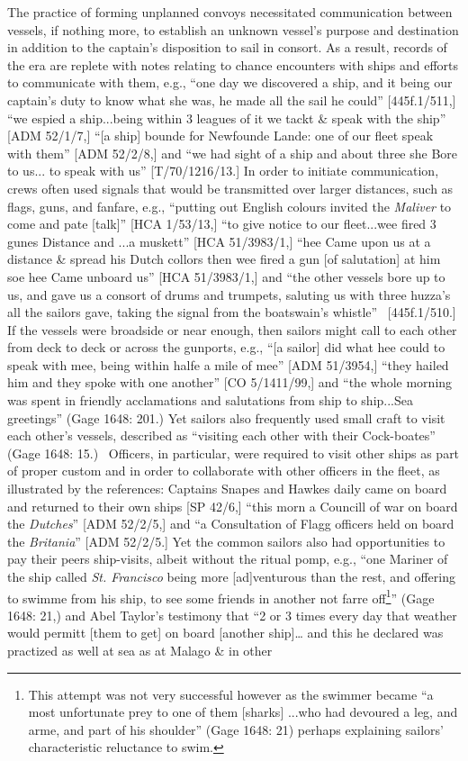 \begin{styleStandard}
The practice of forming unplanned convoys necessitated communication between vessels, if nothing more, to establish an unknown vessel’s purpose and destination in addition to the captain’s disposition to sail in consort. As a result, records of the era are replete with notes relating to chance encounters with ships and efforts to communicate with them, e.g., “one day we discovered a ship, and it being our captain’s duty to know what she was, he made all the sail he could” [445f.1/511,] “we espied a ship...being within 3 leagues of it we tackt \& speak with the ship” [ADM 52/1/7,] “[a ship] bounde for Newfounde Lande: one of our fleet speak with them” [ADM 52/2/8,] and “we had sight of a ship and about three she Bore to us... to speak with us” [T/70/1216/13.] In order to initiate communication, crews often used signals that would be transmitted over larger distances, such as flags, guns, and fanfare, e.g., “putting out English colours invited the \textit{Maliver} to come and pate [talk]” [HCA 1/53/13,] “to give notice to our fleet...wee fired 3 gunes Distance and ...a muskett” [HCA 51/3983/1,] “hee Came upon us at a distance \& spread his Dutch collors then wee fired a gun [of salutation] at him soe hee Came unboard us” [HCA 51/3983/1,] and “the other vessels bore up to us, and gave us a consort of drums and trumpets, saluting us with three huzza’s all the sailors gave, taking the signal from the boatswain’s whistle” \ [445f.1/510.] If the vessels were broadside or near enough, then sailors might call to each other from deck to deck or across the gunports, e.g., “[a sailor] did what hee could to speak with mee, being within halfe a mile of mee” [ADM 51/3954,] “they hailed him and they spoke with one another” [CO 5/1411/99,] and “the whole morning was spent in friendly acclamations and salutations from ship to ship...Sea greetings” (Gage 1648: 201.) Yet sailors also frequently used small craft to visit each other’s vessels, described as “visiting each other with their Cock-boates” (Gage 1648: 15.) \ Officers, in particular, were required to visit other ships as part of proper custom and in order to collaborate with other officers in the fleet, as illustrated by the references: Captains Snapes and Hawkes daily came on board and returned to their own ships [SP 42/6,] “this morn a Councill of war on board the \textit{Dutches}” [ADM 52/2/5,] and “a Consultation of Flagg officers held on board the \textit{Britania}” [ADM 52/2/5.] Yet the common sailors also had opportunities to pay their peers ship-visits, albeit without the ritual pomp, e.g., “one Mariner of the ship called \textit{St. Francisco} being more [ad]venturous than the rest, and offering to swimme from his ship, to see some friends in another not farre off\footnote{ This attempt was not very successful however as the swimmer became “a most unfortunate prey to one of them [sharks] ...who had devoured a leg, and arme, and part of his shoulder” (Gage 1648: 21) perhaps explaining sailors’ characteristic reluctance to swim.}” (Gage 1648: 21,) and Abel Taylor’s testimony that “2 or 3 times every day that weather would permitt [them to get] on board [another ship]… and this he declared was practized as well at sea as at Malago \& in other 
\end{styleStandard}

